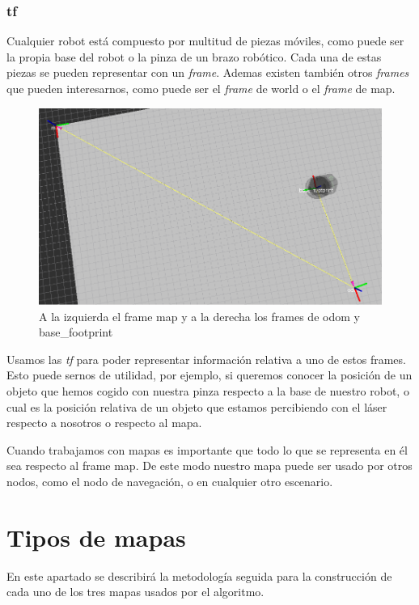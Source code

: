 \subsubsection{tf}
\label{subsubsec:tf}
Cualquier robot está compuesto por multitud de piezas móviles, como puede ser la propia base del robot o la pinza de un brazo robótico. Cada una de estas piezas se pueden representar con un \textit{frame}. Ademas existen también otros \textit{frames} que pueden interesarnos, como puede ser el \textit{frame} de world o el \textit{frame} de map.
\begin{figure} [hbtp]
  \begin{center}
    \includegraphics[width=12cm]{img/cap4/frames}
  \end{center}
  \caption{A la izquierda el frame map y a la derecha los frames de odom y base\_footprint}
  \label{fig:frames}
\end{figure}

Usamos las \textit{tf} para poder representar información relativa a uno de estos frames. Esto puede sernos de utilidad, por ejemplo, si queremos conocer la posición de un objeto que hemos cogido con nuestra pinza respecto a la base de nuestro robot, o cual es la posición relativa de un objeto que estamos percibiendo con el láser respecto a nosotros o respecto al mapa.

Cuando trabajamos con mapas es importante que todo lo que se representa en él sea respecto al frame map. De este modo nuestro mapa puede ser usado por otros nodos, como el nodo de navegación, o en cualquier otro escenario. \pagebreak

\section{Tipos de mapas}

En este apartado se describirá la metodología seguida para la construcción de cada uno de los tres mapas usados por el algoritmo.

